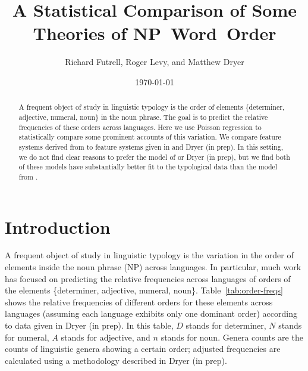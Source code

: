 \documentclass[11pt]{article}
\title{A Statistical Comparison of Some Theories of NP~Word~Order}
\author{Richard Futrell, Roger Levy, and Matthew Dryer}
\date{\today}
\begin{document}
\maketitle
 
\begin{abstract}
  A frequent object of study in linguistic typology is the order of elements \{determiner, adjective, numeral, noun\} in the noun phrase. The goal is to predict the relative frequencies of these orders across languages. Here we use Poisson regression to statistically compare some prominent accounts of this variation. We compare feature systems derived from \citet{cinque2005deriving} to feature systems given in \citet{cysouw2010dealing} and Dryer (in prep). In this setting, we do not find clear reasons to prefer the model of \citet{cinque2005deriving} or Dryer (in prep), but we find both of these models have substantially better fit to the typological data than the model from \citet{cysouw2010dealing}.
\end{abstract}

\section{Introduction}

A frequent object of study in linguistic typology is the variation in the order of elements inside the noun phrase (NP) across languages.
In particular, much work has focused on predicting the relative frequencies across languages of orders of the elements \{determiner, adjective, numeral, noun\}.
Table~\ref{tab:order-freqs} shows the relative frequencies of different orders for these elements across languages (assuming each language exhibits only one dominant order) according to data given in Dryer (in prep).
In this table, $D$ stands for determiner, $N$ stands for numeral, $A$ stands for adjective, and $n$ stands for noun.
Genera counts are the counts of linguistic genera showing a certain order; adjusted frequencies are calculated using a methodology described in Dryer (in prep).
\end{document}
